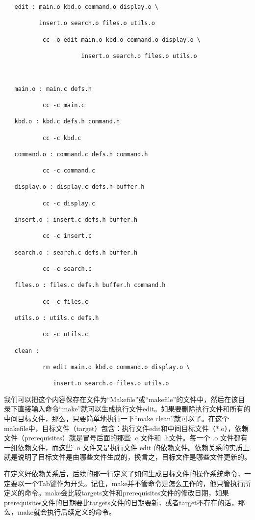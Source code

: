 \documentclass[]{book}
\begin{document}
\begin{verbatim}
   edit : main.o kbd.o command.o display.o \

          insert.o search.o files.o utils.o

           cc -o edit main.o kbd.o command.o display.o \

                      insert.o search.o files.o utils.o

 

   main.o : main.c defs.h

           cc -c main.c

   kbd.o : kbd.c defs.h command.h

           cc -c kbd.c

   command.o : command.c defs.h command.h

           cc -c command.c

   display.o : display.c defs.h buffer.h

           cc -c display.c

   insert.o : insert.c defs.h buffer.h

           cc -c insert.c

   search.o : search.c defs.h buffer.h

           cc -c search.c

   files.o : files.c defs.h buffer.h command.h

           cc -c files.c

   utils.o : utils.c defs.h

           cc -c utils.c

   clean :

           rm edit main.o kbd.o command.o display.o \

              insert.o search.o files.o utils.o
\end{verbatim}

我们可以把这个内容保存在文件为``Makefile''或``makefile''的文件中，然后在该目录下直接输入命令``make''就可以生成执行文件edit。如果要删除执行文件和所有的中间目标文件，那么，只要简单地执行一下``make clean''就可以了。在这个makefile中，目标文件（target）包含：执行文件edit和中间目标文件（*.o），依赖文件（prerequisites）就是冒号后面的那些 .c 文件和 .h文件。每一个 .o 文件都有一组依赖文件，而这些 .o 文件又是执行文件 edit 的依赖文件。依赖关系的实质上就是说明了目标文件是由哪些文件生成的，换言之，目标文件是哪些文件更新的。

在定义好依赖关系后，后续的那一行定义了如何生成目标文件的操作系统命令，一定要以一个Tab键作为开头。记住，make并不管命令是怎么工作的，他只管执行所定义的命令。make会比较targets文件和prerequisites文件的修改日期，如果prerequisites文件的日期要比targets文件的日期要新，或者target不存在的话，那么，make就会执行后续定义的命令。
\end{document}
